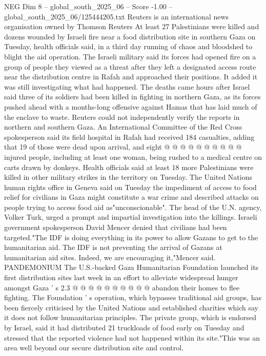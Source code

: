 \begin{textsample}{NEG Dim 8 – global\_south\_2025\_06 – Score -1.00 – global\_south\_2025\_06/125444205.txt}  \label{ex:f8_neg_254}
Reuters is an international news organisation owned by Thomson Reuters At least 27 Palestinians were killed and dozens wounded by Israeli fire near a food distribution site in southern Gaza on Tuesday, health officials said, in a third day running of chaos and bloodshed to blight the aid operation.
The Israeli military said its forces had opened fire on a group of people they viewed as a threat after they left a designated access route near the distribution centre in Rafah and approached their positions.
It added it was still investigating what had happened.
The deaths came hours after Israel said three of its soldiers had been killed in fighting in northern Gaza, as its forces pushed ahead with a months-long offensive against Hamas that has laid much of the enclave to waste.
Reuters could not independently verify the reports in northern and southern Gaza.
An International Committee of the Red Cross spokesperson said its field hospital in Rafah had received 184 casualties, adding that 19 of those were dead upon arrival, and eight @ @ @ @ @ @ @ @ @ @ injured people, including at least one woman, being rushed to a medical centre on carts drawn by donkeys.
Health officials said at least 18 more Palestinians were killed in other military strikes in the territory on Tuesday.
The United Nations human rights office in Geneva said on Tuesday the impediment of access to food relief for civilians in Gaza might constitute a war crime and described attacks on people trying to access food aid as"unconscionable".
The head of the U.N. agency, Volker Turk, urged a prompt and impartial investigation into the killings.
Israeli government spokesperson David Mencer denied that civilians had been targeted."The IDF is doing everything in its power to allow Gazans to get to the humanitarian aid.
The IDF is not preventing the arrival of Gazans at humanitarian aid sites.
Indeed, we are encouraging it,"Mencer said.
PANDEMONIUM The U.S.-backed Gaza Humanitarian Foundation launched its first distribution sites last week in an effort to alleviate widespread hunger amongst Gaza ' s 2.3 @ @ @ @ @ @ @ @ @ @ abandon their homes to flee fighting.
The Foundation ' s operation, which bypasses traditional aid groups, has been fiercely criticised by the United Nations and established charities which say it does not follow humanitarian principles.
The private group, which is endorsed by Israel, said it had distributed 21 truckloads of food early on Tuesday and stressed that the reported violence had not happened within its site."This was an area well beyond our secure distribution site and control.

\end{textsample}
